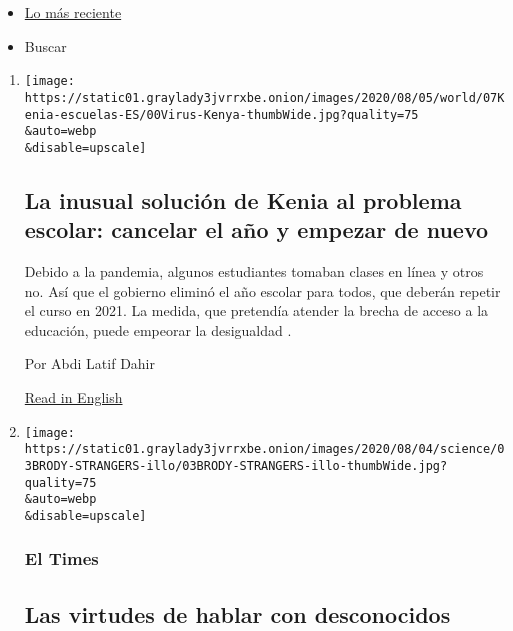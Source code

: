\begin{itemize}
\tightlist
\item
  \protect\hyperlink{stream-panel}{Lo más reciente}
\item
  Buscar
\end{itemize}

\begin{enumerate}
\def\labelenumi{\arabic{enumi}.}
\item
  \href{/es/2020/08/07/espanol/mundo/cierre-escuela-coronavirus-kenia.html}{}

  \texttt{[image: https://static01.graylady3jvrrxbe.onion/images/2020/08/05/world/07Kenia-escuelas-ES/00Virus-Kenya-thumbWide.jpg?quality=75\\\&auto=webp\\\&disable=upscale]}

  \hypertarget{la-inusual-soluciuxf3n-de-kenia-al-problema-escolar-cancelar-el-auxf1o-y-empezar-de-nuevo-1}{%
  \subsection{La inusual solución de Kenia al problema escolar: cancelar
  el año y empezar de
  nuevo}\label{la-inusual-soluciuxf3n-de-kenia-al-problema-escolar-cancelar-el-auxf1o-y-empezar-de-nuevo-1}}

  Debido a la pandemia, algunos estudiantes tomaban clases en línea y
  otros no. Así que el gobierno eliminó el año escolar para todos, que
  deberán repetir el curso en 2021. La medida, que pretendía atender la
  brecha de acceso a la educación, puede empeorar la desigualdad .

  Por Abdi Latif Dahir

  \href{https://www.nytimes3xbfgragh.onion/2020/08/05/world/africa/Kenya-cancels-school-year-coronavirus.html}{Read
  in English}
\item
  \href{/es/2020/08/07/espanol/explosion-libano-coronavirus.html}{}

  \texttt{[image: https://static01.graylady3jvrrxbe.onion/images/2020/08/04/science/03BRODY-STRANGERS-illo/03BRODY-STRANGERS-illo-thumbWide.jpg?quality=75\\\&auto=webp\\\&disable=upscale]}

  \hypertarget{el-times}{%
  \subsubsection{El Times}\label{el-times}}

  \hypertarget{las-virtudes-de-hablar-con-desconocidos}{%
  \subsection{Las virtudes de hablar con
  desconocidos}\label{las-virtudes-de-hablar-con-desconocidos}}


\end{enumerate}
